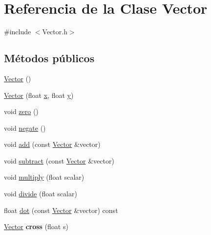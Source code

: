\hypertarget{classVector}{}\section{Referencia de la Clase Vector}
\label{classVector}


{\ttfamily \#include $<$Vector.\+h$>$}

\subsection*{Métodos públicos}
\begin{DoxyCompactItemize}
\item 
\hyperlink{classVector_a6f80c73b5f18dcf3f8e36065bdc8b9e5}{Vector} ()
\item 
\hyperlink{classVector_a7b248851572c39229270f04c3dd192d8}{Vector} (float \hyperlink{classVector_aca49165049a1e21ae47afcfc078819ed}{x}, float \hyperlink{classVector_a81be9102fca6d9beea3efef522c4c09d}{y})
\item 
void \hyperlink{classVector_a0cc91580a3011a9eebda448ff4c6e71d}{zero} ()
\item 
void \hyperlink{classVector_acc4fab345402e8979203dbc9ac1a8aea}{negate} ()
\item 
void \hyperlink{classVector_a4b5f64de730e759afc88fd53e98d3c1b}{add} (const \hyperlink{classVector}{Vector} \&vector)
\item 
void \hyperlink{classVector_ac0f345b85e9fff7cfbcbf991c169098c}{subtract} (const \hyperlink{classVector}{Vector} \&vector)
\item 
void \hyperlink{classVector_a3e8105767c84093c371ea87d13884fd0}{multiply} (float scalar)
\item 
void \hyperlink{classVector_ad1cdb507ea463624b707df32f44ca1cf}{divide} (float scalar)
\item 
float \hyperlink{classVector_a6085c16ca644e4530b1e0c618fab556f}{dot} (const \hyperlink{classVector}{Vector} \&vector) const 
\item 
\hypertarget{classVector_a42cd8aa8e911feefd505634eb6efdcc6}{}\hyperlink{classVector}{Vector} {\bfseries cross} (float s)\label{classVector_a42cd8aa8e911feefd505634eb6efdcc6}


\end{DoxyCompactItemize}
